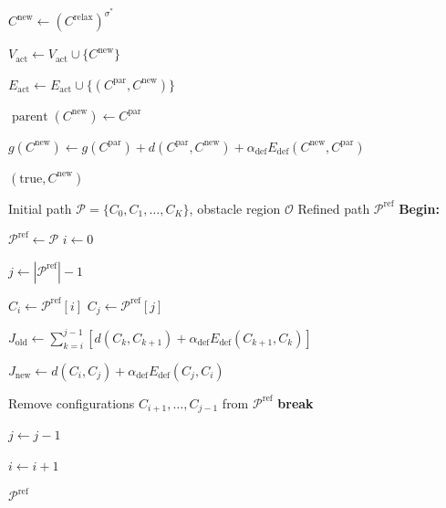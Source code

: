 \documentclass{pas}
\begin{document}
\begin{algorithm}[t]
\begin{algorithmic}[1]
\State \(C^{\mathrm{new}}\gets
\left(C^{\mathrm{relax}}\right)^{\sigma^{\ast}}\)

\State \(V_{\mathrm{act}}\gets V_{\mathrm{act}}\cup\{C^{\mathrm{new}}\}\)

\State \(E_{\mathrm{act}}\gets E_{\mathrm{act}}\cup
\{(C^{\mathrm{par}},C^{\mathrm{new}})\}\)

\State \(\operatorname{parent}(C^{\mathrm{new}})\gets C^{\mathrm{par}}\)

\State \(g(C^{\mathrm{new}})\gets
g(C^{\mathrm{par}})
+d(C^{\mathrm{par}},C^{\mathrm{new}})
+\alpha_{\mathrm{def}}E_{\mathrm{def}}(C^{\mathrm{new}},C^{\mathrm{par}})\)

\State \Return \((\mathrm{true},C^{\mathrm{new}})\)

\end{algorithmic}
\end{algorithm}


\begin{algorithm}[t]
\small
\caption{Shortcut Refinement}
\label{alg:gcr_refine}
\begin{algorithmic}[1]
\Require Initial path \(\mathcal{P}=\{C_0,C_1,\ldots,C_K\}\), obstacle region
\(\mathcal{O}\)
\Ensure Refined path \(\mathcal{P}^{\mathrm{ref}}\)
\Statex \textbf{Begin:}

\State \(\mathcal{P}^{\mathrm{ref}}\gets\mathcal{P}\)
\State \(i\gets0\)

    \State \(j\gets |\mathcal{P}^{\mathrm{ref}}|-1\)

        \State \(C_i\gets \mathcal{P}^{\mathrm{ref}}[i]\)
        \State \(C_j\gets \mathcal{P}^{\mathrm{ref}}[j]\)

        \State \(J_{\mathrm{old}}\gets
        \displaystyle\sum_{k=i}^{j-1}
        \left[
        d(C_k,C_{k+1})
        +\alpha_{\mathrm{def}}E_{\mathrm{def}}(C_{k+1},C_k)
        \right]\)

        \State \(J_{\mathrm{new}}\gets
        d(C_i,C_j)+\alpha_{\mathrm{def}}E_{\mathrm{def}}(C_j,C_i)\)

            \State Remove configurations \(C_{i+1},\ldots,C_{j-1}\) from
            \(\mathcal{P}^{\mathrm{ref}}\)
            \State \textbf{break}
        \EndIf

        \State \(j\gets j-1\)
    \EndWhile

    \State \(i\gets i+1\)
\EndWhile

\State \Return \(\mathcal{P}^{\mathrm{ref}}\)

\end{algorithmic}
\end{algorithm}
\end{document}
